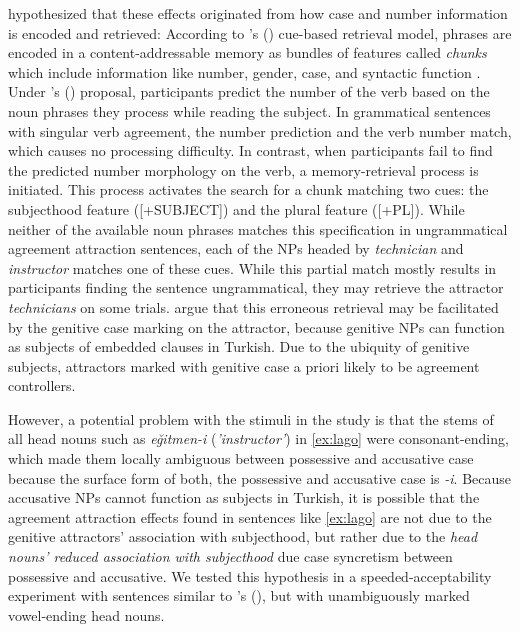 \documentclass[apacite,linguex]{glossa}\usepackage[]{graphicx}\usepackage[]{color}
\begin{document}
\citet{LagoEtAl:2019} hypothesized that these effects originated from how case and number information is encoded and retrieved: According to \citeauthor{LewisVasishth:2005}'s (\citeyear{LewisVasishth:2005}) cue-based retrieval model, phrases are encoded in a content-addressable memory as bundles of features called \textit{chunks} which include information like number, gender, case, and syntactic function \citep[e.g.,][]{SmithVasishth:2020}. Under \citeauthor{LagoEtAl:2019}'s (\citeyear{LagoEtAl:2019}) proposal, participants predict the number of the verb based on the noun phrases they process while reading the subject. In grammatical sentences with singular verb agreement, the number prediction and the verb number match, which causes no processing difficulty. In contrast, when participants fail to find the predicted number morphology on the verb, a memory-retrieval process is initiated. This process activates the search for a chunk matching two cues: the subjecthood feature ([+SUBJECT]) and the plural feature ([+PL]). While neither of the available noun phrases matches this specification in ungrammatical agreement attraction sentences, each of the NPs headed by \textit{technician} and \textit{instructor} matches one of these cues. While this partial match mostly results in participants finding the sentence ungrammatical, they may retrieve the attractor \textit{technicians} on some trials. \citet{LagoEtAl:2019} argue that this erroneous retrieval may be facilitated by the genitive case marking on the attractor, because genitive NPs can function as subjects of embedded clauses in Turkish. Due to the ubiquity of genitive subjects, attractors marked with genitive case a priori likely to be agreement controllers.

However, a potential problem with the stimuli in the \citet{LagoEtAl:2019} study is that the stems of all head nouns such as \textit{eğitmen-i} (\textit{'instructor'}) in \ref{ex:lago} were consonant-ending, which made them locally ambiguous between possessive and accusative case \citep[pp. 66--67]{GokselKerslake:2005} because the surface form of both, the possessive and accusative case is \textit{-i}. 
%
Because accusative NPs cannot function as subjects in Turkish, it is possible that the agreement attraction effects found in sentences like \ref{ex:lago} are not due to the genitive attractors' association with subjecthood, but rather due to the \textit{head nouns' reduced association with subjecthood} due case syncretism between possessive and accusative. We tested this hypothesis in a speeded-acceptability experiment with sentences similar to \citeauthor{LagoEtAl:2019}'s (\citeyear{LagoEtAl:2019}), but with unambiguously marked vowel-ending head nouns.
\end{document}
